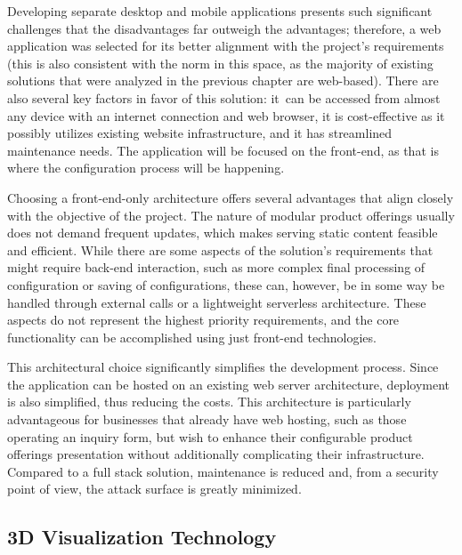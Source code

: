 Developing separate desktop and mobile applications presents such significant challenges that the disadvantages far outweigh the advantages; therefore, a web application was selected for its better alignment with the project's requirements (this is also consistent with the norm in this space, as the majority of existing solutions that were analyzed in the previous chapter are web-based). There are also several key factors in favor of this solution: it~can be accessed from almost any device with an internet connection and web browser, it is cost-effective as it possibly utilizes existing website infrastructure, and it has streamlined maintenance needs. The application will be focused on the front-end, as that is where the configuration process will be happening.

Choosing a front-end-only architecture offers several advantages that align closely with the objective of the project. The nature of modular product offerings usually does not demand frequent updates, which makes serving static content feasible and efficient. While there are some aspects of the solution's requirements that might require back-end interaction, such as more complex final processing of configuration or saving of configurations, these can, however, be in some way be handled through external  calls or a lightweight serverless architecture. These aspects do not represent the highest priority requirements, and the core functionality can be accomplished using just front-end technologies.

This architectural choice significantly simplifies the development process. Since the application can be hosted on an existing web server architecture, deployment is also simplified, thus reducing the costs. This architecture is particularly advantageous for businesses that already have web hosting, such as those operating an inquiry form, but wish to enhance their configurable product offerings presentation without additionally complicating their infrastructure. Compared to a full stack solution, maintenance is reduced and, from a security point of view, the attack surface is greatly minimized.



\subsection{3D Visualization Technology} \label{section:3Dvistech}

